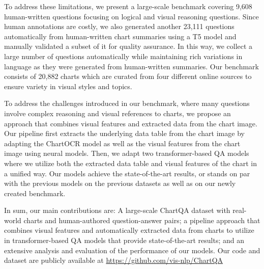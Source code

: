 \documentclass[11pt]{article}
\newcommand{\joty}[1]{\textcolor{cyan}{(Joty: #1)}}
\begin{document}
To address these limitations, 
we present a large-scale 
benchmark covering  9,608 human-written questions focusing on logical and visual reasoning questions. Since human annotations are costly, we 
also generated  another 23,111 questions automatically  from human-written chart summaries using a T5 model \cite{Raffel2020t5} 
and manually validated a subset of it for quality assurance.
In this way, we collect a large number of questions automatically while maintaining rich variations in language as they were generated from human-written summaries. Our benchmark consists of 20,882 charts which are curated from four different online
sources to ensure variety in visual styles and topics. %


To address the challenges introduced in our benchmark,
where many questions involve complex reasoning and visual references to charts, we propose an approach that combines visual features and extracted data from the chart image. Our pipeline first extracts the underlying data table from the chart image by adapting the ChartOCR model \cite{ChartOCR} as well as the visual features from the chart image using neural models. Then, we adapt two  transformer-based QA models where we utilize both the extracted data table and visual features of the chart in a unified way. Our models achieve the state-of-the-art results, or stands on par with the previous models on the previous datasets as well as on our newly created benchmark. 


In sum, our main contributions are: \Ni A large-scale ChartQA dataset with real-world charts and human-authored question-answer pairs; \Nii a pipeline approach that combines visual features and automatically extracted data from charts to  utilize in transformer-based QA models that provide state-of-the-art results; and \Niii an extensive analysis and evaluation of the performance of our models. Our code and dataset are publicly available at
\url{https://github.com/vis-nlp/ChartQA}
\end{document}
